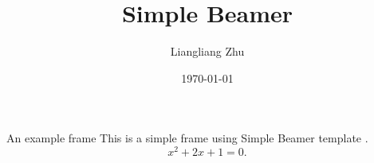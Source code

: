 \documentclass[lang=en,aspectratio=169,theme=retro,logo=on]{simplebeamer}
\title{Simple Beamer}
\author{Liangliang Zhu}
\date{\today}
\begin{document}
\maketitle

\begin{frame}{An example frame}
    This is a simple frame using Simple Beamer template .
    \begin{equation}
        x^{2} + 2x + 1 = 0.
    \end{equation}
\end{frame}

\printbibliography[heading=simplebeamer]
\end{document}
